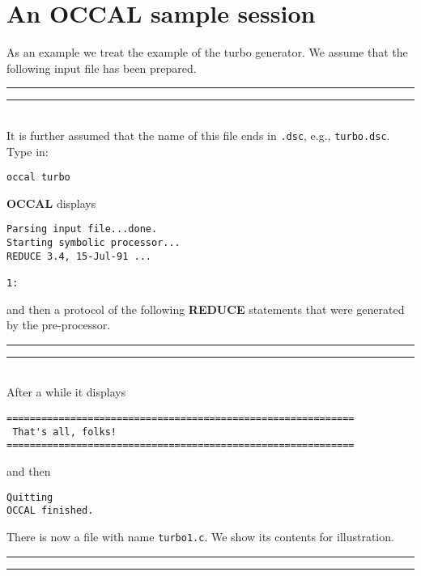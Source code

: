 \documentclass[12pt,a4paper]{article}
\newcommand{\OCCAL}{{\sf\bf OCCAL}}
\newcommand{\REDUCE}{{\sf\bf REDUCE}}
\newlength{\dummy}
\begin{document}
\newpage

\appendix

\renewcommand{\thesection}{Appendix~\Alph{section}}
\renewcommand{\thesubsection}{\Alph{section}.\arabic{subsection}}

\section[\protect\hspace*{\dummy}An \OCCAL{} sample session\protect\hspace*{-\dummy}]%
        {An \OCCAL{} sample session}

\label{java.app-turbo}
As an example we treat the example of the turbo generator. We assume
that the following input file has been prepared.\\
\rule{\textwidth}{0.6mm}
\begin{small}
  
\end{small}
\rule{\textwidth}{0.6mm}\\[3mm]
It is further assumed that the name of this file ends in
\verb|.dsc|, e.g., \verb|turbo.dsc|.
Type in:
\begin{verbatim}
occal turbo
\end{verbatim}
\OCCAL{} displays
\begin{verbatim}
Parsing input file...done.
Starting symbolic processor...
REDUCE 3.4, 15-Jul-91 ...

1:

\end{verbatim}
and then a protocol of the following \REDUCE{} statements that were
generated by the pre-processor.\\
\rule{\textwidth}{0.6mm}
\begin{small}
  
\end{small}
\rule{\textwidth}{0.6mm}\\[3mm]
After a while it displays
\begin{verbatim}
============================================================
 That's all, folks!
============================================================
\end{verbatim}
and then
\begin{verbatim}
Quitting
OCCAL finished.
\end{verbatim}
There is now a file with name \verb|turbo1.c|. We show its contents for illustration.\\
\rule{\textwidth}{0.6mm}
\begin{small}
  
\end{small}
\rule{\textwidth}{0.6mm}
\end{document}
